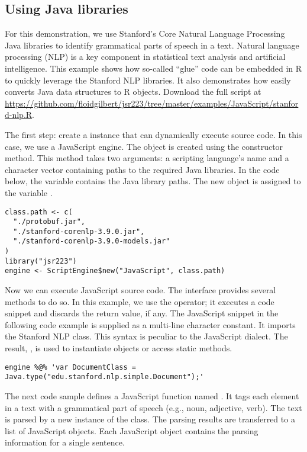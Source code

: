 \subsection{Using Java libraries}

For this demonstration, we use Stanford's Core Natural Language Processing Java libraries \citep{stanfordcorenlp} to identify grammatical parts of speech in a text. Natural language processing (NLP) is a key component in statistical text analysis and artificial intelligence. This example shows how so-called ``glue'' code can be embedded in R to quickly leverage the Stanford NLP libraries. It also demonstrates how easily  converts Java data structures to R objects. Download the full script at \url{https://github.com/floidgilbert/jsr223/tree/master/examples/JavaScript/stanford-nlp.R}.

The first step: create a   instance that can dynamically execute source code. In this case, we use a JavaScript engine. The object is created using the  constructor method. This method takes two arguments: a scripting language's name and a character vector containing paths to the required Java libraries. In the code below, the  variable contains the Java library paths. The new  object is assigned to the variable .

\begin{verbatim}
class.path <- c(
  "./protobuf.jar",
  "./stanford-corenlp-3.9.0.jar",
  "./stanford-corenlp-3.9.0-models.jar"
)
library("jsr223")
engine <- ScriptEngine$new("JavaScript", class.path)
\end{verbatim}
Now we can execute JavaScript source code. The  interface provides several methods to do so. In this example, we use the  operator; it  executes a code snippet and discards the return value, if any. The JavaScript snippet in the following code example is supplied as a multi-line character constant. It imports the Stanford NLP  class. This syntax is peculiar to the JavaScript dialect. The result, , is used to instantiate objects or access static methods.

\begin{verbatim}
engine %@% 'var DocumentClass = Java.type("edu.stanford.nlp.simple.Document");'
\end{verbatim}
The next code sample defines a JavaScript function named . It tags each element in a text with a grammatical part of speech (e.g., noun, adjective, verb). The text is parsed by a new instance of the  class. The parsing results are transferred to a list of JavaScript objects. Each JavaScript object contains the parsing information for a single sentence.

